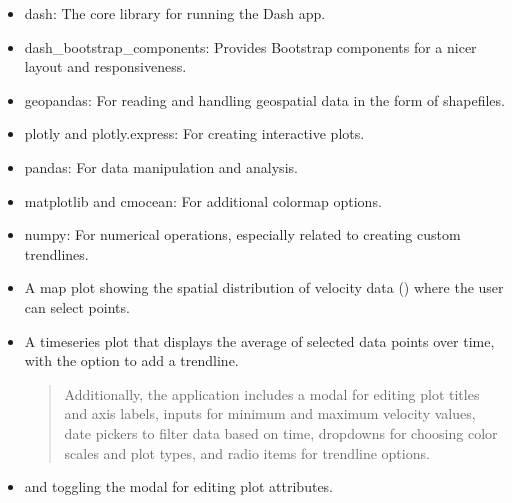 \documentclass[letterpaper,10pt,english]{sphinxmanual}
\begin{document}
\begin{fulllineitems}
\begin{description}
\begin{itemize}
\item {} 
\sphinxAtStartPar
dash: The core library for running the Dash app.

\item {} 
\sphinxAtStartPar
dash\_bootstrap\_components: Provides Bootstrap components for a nicer layout and responsiveness.

\item {} 
\sphinxAtStartPar
geopandas: For reading and handling geospatial data in the form of shapefiles.

\item {} 
\sphinxAtStartPar
plotly and plotly.express: For creating interactive plots.

\item {} 
\sphinxAtStartPar
pandas: For data manipulation and analysis.

\item {} 
\sphinxAtStartPar
matplotlib and cmocean: For additional colormap options.

\item {} 
\sphinxAtStartPar
numpy: For numerical operations, especially related to creating custom trendlines.

\end{itemize}

\begin{itemize}
\item {} 
\sphinxAtStartPar
A map plot showing the spatial distribution of velocity data () where the user can select points.

\item {} 
\sphinxAtStartPar
A time\sphinxhyphen{}series plot that displays the average of selected data points over time, with the option to add a trendline.
\begin{quote}

\sphinxAtStartPar
Additionally, the application includes a modal for editing plot titles and axis labels, inputs for
minimum and maximum velocity values, date pickers to filter data based on time, dropdowns for choosing color scales 
and plot types, and radio items for trendline options.
\end{quote}

\end{itemize}

\begin{itemize}
\item {} \begin{description}
\sphinxAtStartPar
and toggling the modal for editing plot attributes.


\end{description}
\end{itemize}
\end{description}
\end{fulllineitems}
\end{document}
